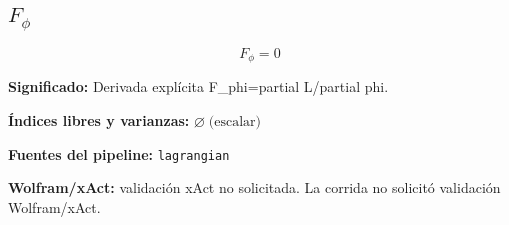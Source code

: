 \documentclass[11pt]{article}
\begin{document}
\subsection*{$ F_{\phi} $}
\begin{dmath*}[breakdepth={5}]
F_{\phi} = 0
\end{dmath*}
\par\vspace{1.2\baselineskip}\noindent
\begin{minipage}{\linewidth}
\textbf{Significado:} Derivada explícita F\_phi=partial L/partial phi.\par
\textbf{Índices libres y varianzas:} $ \varnothing\;\text{(escalar)} $\par
\textbf{Fuentes del pipeline:} \texttt{lagrangian}\par
\textbf{Wolfram/xAct:} validación xAct no solicitada. La corrida no solicitó validación Wolfram/xAct.\par
\end{minipage}
\end{document}
